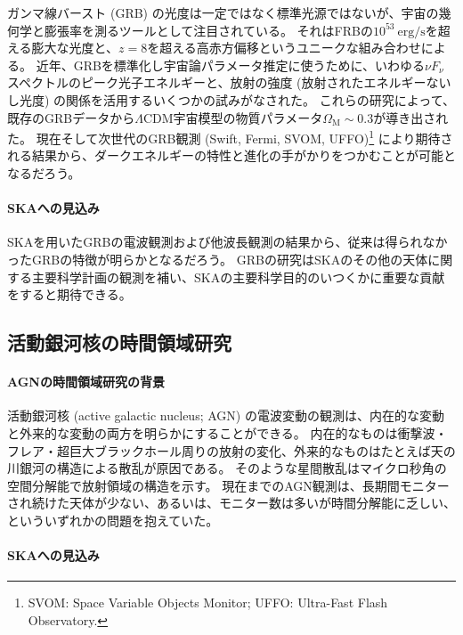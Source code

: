 ガンマ線バースト (GRB) の光度は一定ではなく標準光源ではないが、宇宙の幾何学と膨張率を測るツールとして注目されている。
それはFRBの$10^{53}~\text{erg/s}$を超える膨大な光度と、$z=8$を超える高赤方偏移というユニークな組み合わせによる。
近年、GRBを標準化し宇宙論パラメータ推定に使うために、いわゆる$\nu F_\nu$スペクトルのピーク光子エネルギーと、放射の強度 (放射されたエネルギーないし光度) の関係を活用するいくつかの試みがなされた。
これらの研究によって、既存のGRBデータから$\Lambda$CDM宇宙模型の物質パラメータ$\Omega_\text{M}\sim 0.3$が導き出された。
現在そして次世代のGRB観測 (Swift, Fermi, SVOM, UFFO)\footnote{SVOM: Space Variable Objects Monitor; UFFO: Ultra-Fast Flash Observatory.} により期待される結果から、ダークエネルギーの特性と進化の手がかりをつかむことが可能となるだろう。

\paragraph{SKAへの見込み}

SKAを用いたGRBの電波観測および他波長観測の結果から、従来は得られなかったGRBの特徴が明らかとなるだろう。
GRBの研究はSKAのその他の天体に関する主要科学計画の観測を補い、SKAの主要科学目的のいつくかに重要な貢献をすると期待できる。

\subsection{活動銀河核の時間領域研究}
\label{c09.s2.ss7}

\paragraph{AGNの時間領域研究の背景}

活動銀河核 (active galactic nucleus; AGN) の電波変動の観測は、内在的な変動と外来的な変動の両方を明らかにすることができる。
内在的なものは衝撃波・フレア・超巨大ブラックホール周りの放射の変化、外来的なものはたとえば天の川銀河の構造による散乱が原因である。
そのような星間散乱はマイクロ秒角の空間分解能で放射領域の構造を示す。
現在までのAGN観測は、長期間モニターされ続けた天体が少ない、あるいは、モニター数は多いが時間分解能に乏しい、といういずれかの問題を抱えていた。

\paragraph{SKAへの見込み}

